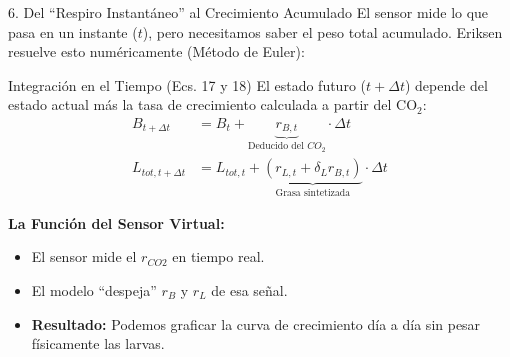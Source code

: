 \documentclass[aspectratio=169, 10pt]{beamer}
\begin{document}
\begin{frame}{6. Del ``Respiro Instantáneo'' al Crecimiento Acumulado}
    El sensor mide lo que pasa en un instante ($t$), pero necesitamos saber el peso total acumulado. Eriksen resuelve esto numéricamente (Método de Euler):

    \vspace{0.3cm}

    \begin{block}{Integración en el Tiempo (Ecs. 17 y 18)}
        El estado futuro ($t + \Delta t$) depende del estado actual más la tasa de crecimiento calculada a partir del CO$_2$:
        \begin{align}
            B_{t+\Delta t} &= B_t + \underbrace{r_{B,t}}_{\text{Deducido del } CO_2} \cdot \Delta t \tag{Ec. 17} \\
            L_{tot, t+\Delta t} &= L_{tot, t} + \underbrace{(r_{L,t} + \delta_L r_{B,t})}_{\text{Grasa sintetizada}} \cdot \Delta t \tag{Ec. 18}
        \end{align}
    \end{block}

    \vspace{0.2cm}
    \textbf{La Función del Sensor Virtual:}
    \begin{itemize}
        \item El sensor mide el $r_{CO2}$ en tiempo real.
        \item El modelo ``despeja'' $r_B$ y $r_L$ de esa señal.
        \item \textbf{Resultado:} Podemos graficar la curva de crecimiento día a día sin pesar físicamente las larvas.
    \end{itemize}
\end{frame}
\end{document}
